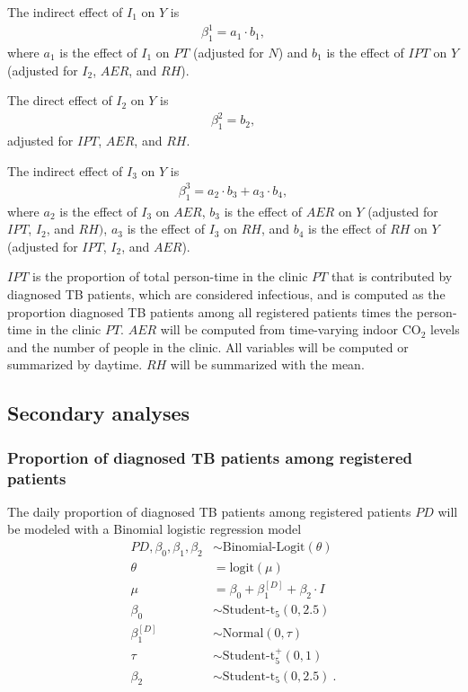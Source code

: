 \documentclass{article}
\begin{document}
The indirect effect of $I_1$ on $Y$ is 
\begin{align*}
    \beta_1^1 = a_1 \cdot b_1,
\end{align*}
where $a_1$ is the effect of $I_1$ on $PT$ (adjusted for $N$) and $b_1$ is the effect of $IPT$ on $Y$ (adjusted for $I_2$, $AER$, and $RH$). 

The direct effect of $I_2$ on $Y$ is
\begin{align*}
    \beta_1^2 = b_2,
\end{align*}
adjusted for $IPT$, $AER$, and $RH$.

The indirect effect of $I_3$ on $Y$ is
\begin{align*}
    \beta_1^3 = a_2 \cdot b_3 + a_3 \cdot b_4,
\end{align*}
where $a_2$ is the effect of $I_3$ on $AER$, $b_3$ is the effect of $AER$ on $Y$ (adjusted for $IPT$, $I_2$, and $RH)$, $a_3$ is the effect of $I_3$ on $RH$, and $b_4$ is the effect of $RH$ on $Y$ (adjusted for $IPT$, $I_2$, and $AER$).

$IPT$ is the proportion of total person-time in the clinic $PT$ that is contributed by diagnosed TB patients, which are considered infectious, and is computed as the proportion diagnosed TB patients among all registered patients times the person-time in the clinic $PT$. $AER$ will be computed from time-varying indoor CO$_2$ levels and the number of people in the clinic. All variables will be computed or summarized by daytime. $RH$ will be summarized with the mean. 


\subsection{Secondary analyses}

\subsubsection{Proportion of diagnosed TB patients among registered patients}

The daily proportion of diagnosed TB patients among registered patients $PD$ will be modeled with a Binomial logistic regression model
\begin{align*}
    PD, \beta_0, \beta_1, \beta_2 &\sim \text{Binomial-Logit}(\theta) \\
    \theta &= \text{logit}(\mu) \\
    \mu &= \beta_0 + \beta_1^{[D]} + \beta_2 \cdot I \\
    \beta_0 &\sim \text{Student-t}_5(0, 2.5) \\
    \beta_1^{[D]} &\sim \text{Normal}(0, \tau) \\
    \tau &\sim \text{Student-t}_5^{+}(0, 1) \\
    \beta_2 &\sim \text{Student-t}_5\left(0, 2.5\right)~.
\end{align*}
\end{document}
